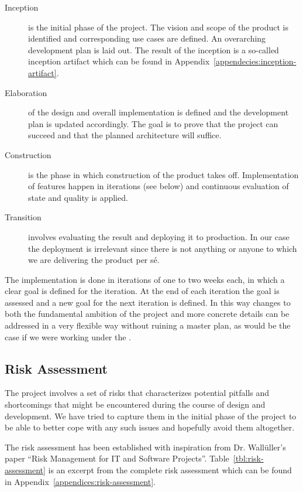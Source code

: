 \begin{description}
\item[Inception] is the initial phase of the project. The vision and scope of
  the product is identified and corresponding use cases are defined. An
  overarching development plan is laid out. The result of the inception is a
  so-called inception artifact which can be found in
  Appendix~\ref{appendecies:inception-artifact}.

\item[Elaboration] of the design and overall implementation is defined and the
  development plan is updated accordingly. The goal is to prove that the project
  can succeed and that the planned architecture will suffice.

\item[Construction] is the phase in which construction of the product takes
  off. Implementation of features happen in iterations (see below) and
  continuous evaluation of state and quality is applied.

\item[Transition] involves evaluating the result and deploying it to
  production. In our case the deployment is irrelevant since there is not
  anything or anyone to which we are delivering the product per s\'e.

\end{description}

The implementation is done in iterations of one to two weeks each, in which a
clear goal is defined for the iteration. At the end of each iteration the goal
is assessed and a new goal for the next iteration is defined. In this way
changes to both the fundamental ambition of the project and more concrete
details can be addressed in a very flexible way without ruining a master plan,
as would be the case if we were working under the .

\subsection{Risk Assessment}
\label{sec:project-mgmt:risk-assessment}

The project involves a set of risks that characterizes potential pitfalls and
shortcomings that might be encountered during the course of design and
development. We have tried to capture them in the initial phase of the project
to be able to better cope with any such issues and hopefully avoid them
altogether.

The risk assessment has been established with inspiration from Dr. Wall\"uller's
paper ``Risk Management for IT and Software
Projects''\cite{risk-assessment}. Table~\ref{tbl:risk-assessment} is an excerpt
from the complete risk assessment which can be found in
Appendix~\ref{appendices:risk-assessment}.

